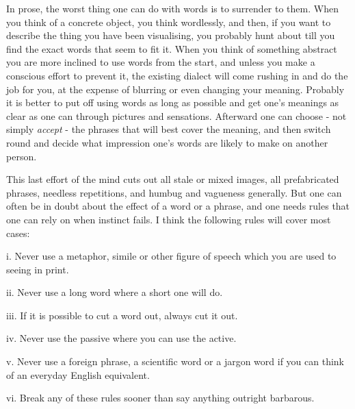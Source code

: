 In prose, the worst thing one can do with words is to surrender to them. When you think of a concrete object, you think wordlessly, and then, if you want to describe the thing you have been visualising, you probably hunt about till you find the exact words that seem to fit it. When you think of something abstract you are more inclined to use words from the start, and unless you make a conscious effort to prevent it, the existing dialect will come rushing in and do the job for you, at the expense of blurring or even changing your meaning. Probably it is better to put off using words as long as possible and get one’s meanings as clear as one can through pictures and sensations. Afterward one can choose - not simply \textit{accept }- the phrases that will best cover the meaning, and then switch round and decide what impression one’s words are likely to make on another person.\par

This last effort of the mind cuts out all stale or mixed images, all prefabricated phrases, needless repetitions, and humbug and vagueness generally. But one can often be in doubt about the effect of a word or a phrase, and one needs rules that one can rely on when instinct fails. I think the following rules will cover most cases:\par

\begin{rquote}
i. Never use a metaphor, simile or other figure of speech which you are used to seeing in print.
\end{rquote}

\begin{rquote}
ii. Never use a long word where a short one will do.
\end{rquote}

\begin{rquote}
iii. If it is possible to cut a word out, always cut it out.
\end{rquote}

\begin{rquote}
iv. Never use the passive where you can use the active.
\end{rquote}

\begin{rquote}
v. Never use a foreign phrase, a scientific word or a jargon word if you can think of an everyday English equivalent.
\end{rquote}

\begin{rquote}
vi. Break any of these rules sooner than say anything outright barbarous.
\end{rquote}

